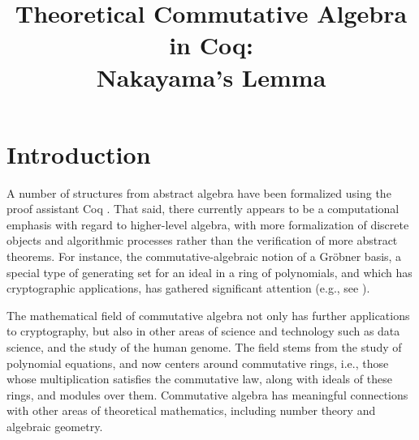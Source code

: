 \documentclass{article}
\begin{document}



\title{%
Theoretical Commutative Algebra in Coq: \\ Nakayama's Lemma}

\date{}


\maketitle





\section{Introduction}

A number of structures from abstract algebra have been formalized using the proof assistant Coq \cite{the_coq_development_team_2019_3476303}.  
That said, there currently appears to be a computational emphasis with regard to higher-level algebra, with more formalization of discrete objects and algorithmic processes rather than the verification of more abstract theorems.   
For instance, the commutative-algebraic notion of a Gr\"obner basis, a special type of generating set for an ideal in a ring of polynomials, and which has cryptographic applications, has gathered significant attention (e.g., see \cite{thery-buchberger}).

The mathematical field of commutative algebra not only has further applications to cryptography, but also in other areas of science and technology such as data science, and the study of the human genome.
The field stems from the study of polynomial equations, and now centers around commutative rings, i.e., those whose multiplication satisfies the commutative law, along with ideals of these rings, and modules over them.  Commutative algebra has meaningful connections with other areas of theoretical mathematics, including number theory and algebraic geometry.
\end{document}
